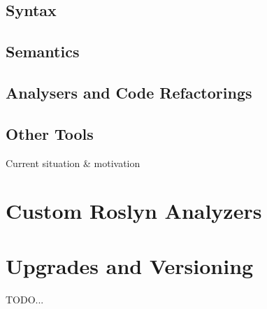 \documentclass[
  digital, %
  table,   %
  lof,     %
  lot,     %
  oneside,
]{fithesis3}
\begin{document}
  
  \section{Syntax}

  \section{Semantics}

  \section{Analysers and Code Refactorings}
  
  \section{Other Tools}

Current situation \& motivation

\chapter{Custom Roslyn Analyzers}
\label{chap:custom-roslyn-analyzers}

	\makeatletter\thesis@blocks@clear\makeatother

	\printindex
    
    \printbibliography

	\appendix %
  \chapter{Upgrades and Versioning}
TODO...
\end{document}
